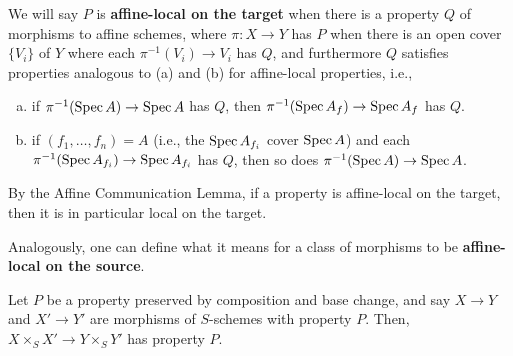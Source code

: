 \documentclass[12pt]{article}
\begin{document}
\begin{defn}
    We will say $P$ is \textbf{affine-local on the target} when there is a property $Q$ of morphisms to affine schemes, where $\pi: X\to Y$ has $P$ when there is an open cover $\{V_i\}$ of $Y$ where each $\pi^{-1}(V_i)\to V_i$ has $Q$, and furthermore $Q$ satisfies properties analogous to (a) and (b) for affine-local properties, i.e.,
    \begin{enumerate}[(a)]
        \item if $\pi^{-1}(\operatorname{Spec} A)\to \operatorname{Spec} A$ has $Q$, then $\pi^{-1}(\operatorname{Spec} A_f)\to \operatorname{Spec} A_f$ has $Q$.
        \item if $(f_1,\dots,f_n)=A$ (i.e., the $\operatorname{Spec} A_{f_i}$ cover $\operatorname{Spec} A$) and each $\pi^{-1}(\operatorname{Spec} A_{f_i}) \to \operatorname{Spec} A_{f_i}$ has $Q$, then so does $\pi^{-1}(\operatorname{Spec} A) \to \operatorname{Spec} A$.
    \end{enumerate}
    By the Affine Communication Lemma, if a property is affine-local on the target, then it is in particular local on the target.

    Analogously, one can define what it means for a class of morphisms to be \textbf{affine-local on the source}.
\end{defn}

\begin{prop}
    Let $P$ be a property preserved by composition and base change, and say $X\to Y$ and $X'\to Y'$ are morphisms of $S$-schemes with property $P$. Then, $X\times_S X' \to Y\times_S Y'$ has property $P$.
\end{prop}
\end{document}
